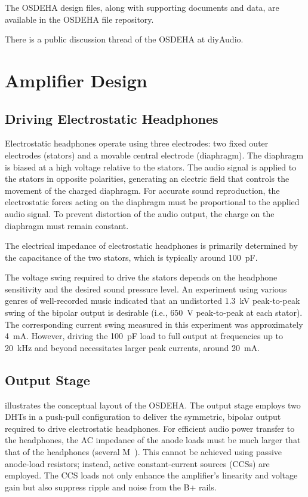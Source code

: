 The OSDEHA design files, along with supporting documents and data, are available in the OSDEHA file repository\cite{osdeha_github}.

There is a public discussion thread of the OSDEHA at diyAudio\cite{osdeha_p1}. 


\section{Amplifier Design}

\subsection{Driving Electrostatic Headphones} 

Electrostatic headphones operate using three electrodes: two fixed outer electrodes (stators) and a movable central electrode (diaphragm). The diaphragm is biased at a high voltage relative to the stators. The audio signal is applied to the stators in opposite polarities, generating an electric field that controls the movement of the charged diaphragm. For accurate sound reproduction, the electrostatic forces acting on the diaphragm must be proportional to the applied audio signal. To prevent distortion of the audio output, the charge on the diaphragm must remain constant.

The electrical impedance of electrostatic headphones is primarily determined by the capacitance of the two stators, which is typically around \SI{100}{pF}\cite{osdeha_p3}.

The voltage swing required to drive the stators depends on the headphone sensitivity and the desired sound pressure level. An experiment using various genres of well-recorded music indicated that an undistorted \SI{1.3}{kV} peak-to-peak swing of the bipolar output is desirable (i.e., \SI{650}{V} peak-to-peak at each stator)\cite{osdeha_p8}. The corresponding current swing measured in this experiment was approximately \SI{4}{mA}. However, driving the \SI{100}{pF} load to full output at frequencies up to \SI{20}{kHz} and beyond necessitates larger peak currents, around \SI{20}{mA}\cite{osdeha_p2}.


\subsection{Output Stage}

 illustrates the conceptual layout of the OSDEHA. The output stage employs two DHTs in a push-pull configuration to deliver the symmetric, bipolar output required to drive electrostatic headphones. For efficient audio power transfer to the headphones, the AC impedance of the anode loads must be much larger that that of the headphones (several \unit{M\Ohm}). This cannot be achieved using passive anode-load resistors; instead, active constant-current sources (CCSs) are employed. The CCS loads not only enhance the amplifier's linearity and voltage gain but also suppress ripple and noise from the B+ rails.

